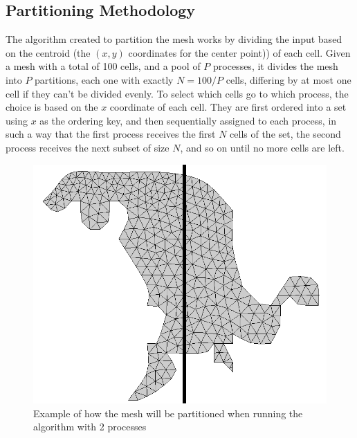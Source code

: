 \subsection{Partitioning Methodology}
\label{subsec:part_method}

The algorithm created to partition the mesh works by dividing the input based on the centroid (the $(x, y)$ coordinates for the center point)) of each cell. Given a mesh with a total of 100 cells, and a pool of $P$ processes, it divides the mesh into $P$ partitions, each one with exactly $N=100/P$ cells, differing by at most one cell if they can't be divided evenly. To select which cells go to which process, the choice is based on the $x$ coordinate of each cell. They are first ordered into a set using $x$ as the ordering key, and then sequentially assigned to each process, in such a way that the first process receives the first $N$ cells of the set, the second process receives the next subset of size $N$, and so on until no more cells are left.

\begin{figure}[!htp]
	\begin{center}
		\includegraphics[width=\columnwidth]{report.may/images/foz_p2_msh}
	\end{center}
	\caption{Example of how the mesh will be partitioned when running the algorithm with 2 processes}
	\label{fig:tasktimeAOS}
\end{figure}

